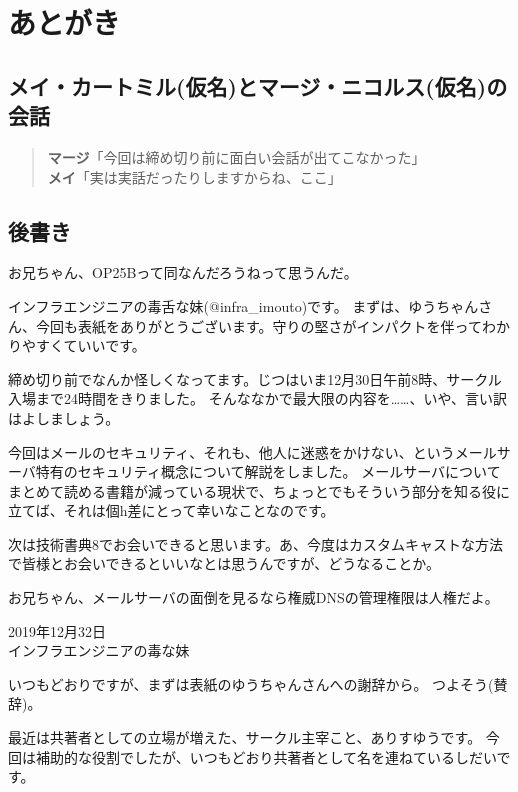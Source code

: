\chapter{あとがき}

\section*{メイ・カートミル(仮名)とマージ・ニコルス(仮名)の会話}

\begin{quotation}
\noindent
{\bf マージ}「今回は締め切り前に面白い会話が出てこなかった」 \\
{\bf メイ}「実は実話だったりしますからね、ここ」 \\
\end{quotation}


\section*{後書き}

お兄ちゃん、OP25Bって同なんだろうねって思うんだ。

インフラエンジニアの毒舌な妹(@infra\_imouto)です。
まずは、ゆうちゃんさん、今回も表紙をありがとうございます。守りの堅さがインパクトを伴ってわかりやすくていいです。

締め切り前でなんか怪しくなってます。じつはいま12月30日午前8時、サークル入場まで24時間をきりました。
そんななかで最大限の内容を……、いや、言い訳はよしましょう。

今回はメールのセキュリティ、それも、他人に迷惑をかけない、というメールサーバ特有のセキュリティ概念について解説をしました。
メールサーバについてまとめて読める書籍が減っている現状で、ちょっとでもそういう部分を知る役に立てば、それは個h差にとって幸いなことなのです。

次は技術書典8でお会いできると思います。あ、今度はカスタムキャストな方法で皆様とお会いできるといいなとは思うんですが、どうなることか。

お兄ちゃん、メールサーバの面倒を見るなら権威DNSの管理権限は人権だよ。

\begin{flushright}
2019年12月32日 \\
インフラエンジニアの毒な妹 \\
\end{flushright}

いつもどおりですが、まずは表紙のゆうちゃんさんへの謝辞から。
つよそう(賛辞)。

最近は共著者としての立場が増えた、サークル主宰こと、ありすゆうです。
今回は補助的な役割でしたが、いつもどおり共著者として名を連ねているしだいです。


